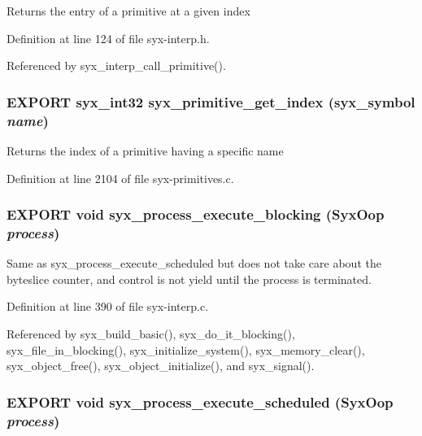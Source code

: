 Returns the entry of a primitive at a given index 

Definition at line 124 of file syx-interp.h.

Referenced by syx\_\-interp\_\-call\_\-primitive().\hypertarget{syx-interp_8h_ffbeb6d55f75e60ad16f0a87bb65a8a2}{
\subsubsection{\setlength{\rightskip}{0pt plus 5cm}EXPORT {\bf syx\_\-int32} syx\_\-primitive\_\-get\_\-index ({\bf syx\_\-symbol} {\em name})}}
\label{syx-interp_8h_ffbeb6d55f75e60ad16f0a87bb65a8a2}


Returns the index of a primitive having a specific name 

Definition at line 2104 of file syx-primitives.c.\hypertarget{syx-interp_8h_1260b0caa0982d0e6d2d0a858bea5867}{
\subsubsection{\setlength{\rightskip}{0pt plus 5cm}EXPORT void syx\_\-process\_\-execute\_\-blocking ({\bf SyxOop} {\em process})}}
\label{syx-interp_8h_1260b0caa0982d0e6d2d0a858bea5867}


Same as syx\_\-process\_\-execute\_\-scheduled but does not take care about the byteslice counter, and control is not yield until the process is terminated. 

Definition at line 390 of file syx-interp.c.

Referenced by syx\_\-build\_\-basic(), syx\_\-do\_\-it\_\-blocking(), syx\_\-file\_\-in\_\-blocking(), syx\_\-initialize\_\-system(), syx\_\-memory\_\-clear(), syx\_\-object\_\-free(), syx\_\-object\_\-initialize(), and syx\_\-signal().\hypertarget{syx-interp_8h_eafe6b33c73dafb5b724de995c487e1b}{
\subsubsection{\setlength{\rightskip}{0pt plus 5cm}EXPORT void syx\_\-process\_\-execute\_\-scheduled ({\bf SyxOop} {\em process})}}
\label{syx-interp_8h_eafe6b33c73dafb5b724de995c487e1b}


